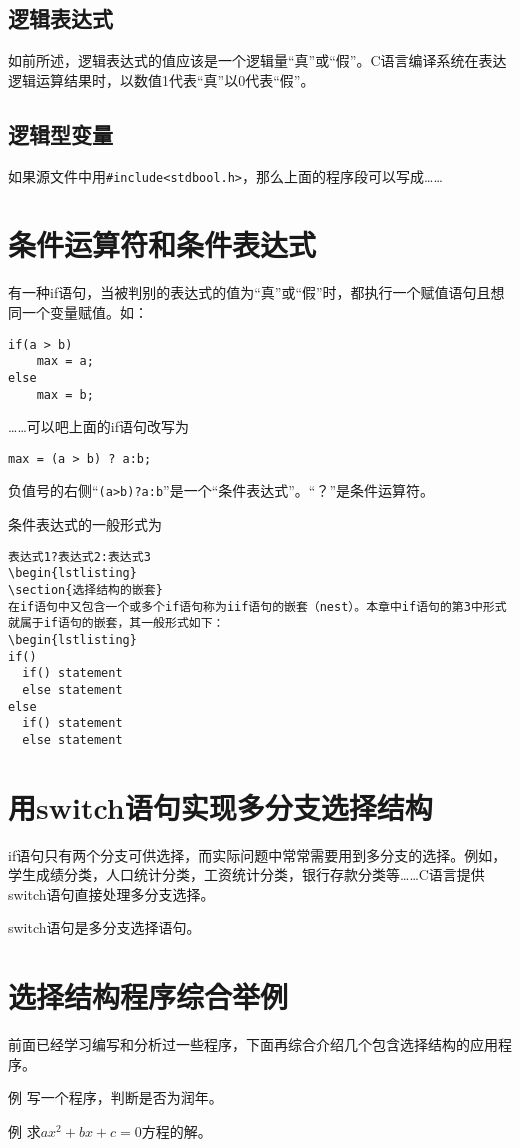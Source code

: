 \subsection{逻辑表达式}
如前所述，逻辑表达式的值应该是一个逻辑量“真”或“假”。C语言编译系统在表达逻辑运算结果时，以数值1代表“真”以0代表“假”。
\subsection{逻辑型变量}
如果源文件中用\verb|#include<stdbool.h>|，那么上面的程序段可以写成……
\section{条件运算符和条件表达式}
有一种if语句，当被判别的表达式的值为“真”或“假”时，都执行一个赋值语句且想同一个变量赋值。如：
\begin{lstlisting}
if(a > b)
	max = a;
else
	max = b;
\end{lstlisting}
……可以吧上面的if语句改写为
\begin{lstlisting}
max = (a > b) ? a:b;
\end{lstlisting}
负值号的右侧“\verb|(a>b)?a:b|”是一个“条件表达式”。“？”是条件运算符。

条件表达式的一般形式为
\begin{lstlisting}
表达式1?表达式2:表达式3
\begin{lstlisting}
\section{选择结构的嵌套}
在if语句中又包含一个或多个if语句称为iif语句的嵌套（nest）。本章中if语句的第3中形式就属于if语句的嵌套，其一般形式如下：
\begin{lstlisting}
if()
  if() statement
  else statement
else
  if() statement
  else statement
\end{lstlisting}
\section{用switch语句实现多分支选择结构}
if语句只有两个分支可供选择，而实际问题中常常需要用到多分支的选择。例如，学生成绩分类，人口统计分类，工资统计分类，银行存款分类等……C语言提供switch语句直接处理多分支选择。

switch语句是多分支选择语句。
\section{选择结构程序综合举例}
前面已经学习编写和分析过一些程序，下面再综合介绍几个包含选择结构的应用程序。

例 写一个程序，判断是否为润年。

例 求$ax^2 + bx + c = 0$方程的解。


